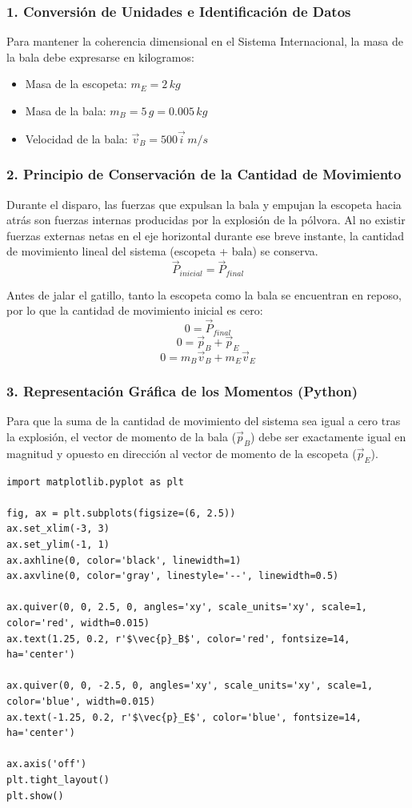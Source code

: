 \documentclass[12pt, a4paper]{article}
\begin{document}
\subsubsection*{1. Conversión de Unidades e Identificación de Datos}
Para mantener la coherencia dimensional en el Sistema Internacional, la masa de la bala debe expresarse en kilogramos:
\begin{itemize}
    \item Masa de la escopeta: $m_E = 2 \, \si{kg}$
    \item Masa de la bala: $m_B = 5 \, \si{g} = 0.005 \, \si{kg}$
    \item Velocidad de la bala: $\vec{v}_B = 500 \vec{i} \, \si{m/s}$
\end{itemize}

\subsubsection*{2. Principio de Conservación de la Cantidad de Movimiento}
Durante el disparo, las fuerzas que expulsan la bala y empujan la escopeta hacia atrás son fuerzas internas producidas por la explosión de la pólvora. Al no existir fuerzas externas netas en el eje horizontal durante ese breve instante, la cantidad de movimiento lineal del sistema (escopeta + bala) se conserva.
\[ \vec{P}_{inicial} = \vec{P}_{final} \]

Antes de jalar el gatillo, tanto la escopeta como la bala se encuentran en reposo, por lo que la cantidad de movimiento inicial es cero:
\[ 0 = \vec{P}_{final} \]
\[ 0 = \vec{p}_B + \vec{p}_E \]
\[ 0 = m_B \vec{v}_B + m_E \vec{v}_E \]

\subsubsection*{3. Representación Gráfica de los Momentos (Python)}
Para que la suma de la cantidad de movimiento del sistema sea igual a cero tras la explosión, el vector de momento de la bala ($\vec{p}_B$) debe ser exactamente igual en magnitud y opuesto en dirección al vector de momento de la escopeta ($\vec{p}_E$).

\begin{lstlisting}
import matplotlib.pyplot as plt

fig, ax = plt.subplots(figsize=(6, 2.5))
ax.set_xlim(-3, 3)
ax.set_ylim(-1, 1)
ax.axhline(0, color='black', linewidth=1)
ax.axvline(0, color='gray', linestyle='--', linewidth=0.5)

ax.quiver(0, 0, 2.5, 0, angles='xy', scale_units='xy', scale=1, color='red', width=0.015)
ax.text(1.25, 0.2, r'$\vec{p}_B$', color='red', fontsize=14, ha='center')

ax.quiver(0, 0, -2.5, 0, angles='xy', scale_units='xy', scale=1, color='blue', width=0.015)
ax.text(-1.25, 0.2, r'$\vec{p}_E$', color='blue', fontsize=14, ha='center')

ax.axis('off')
plt.tight_layout()
plt.show()
\end{lstlisting}
\end{document}
